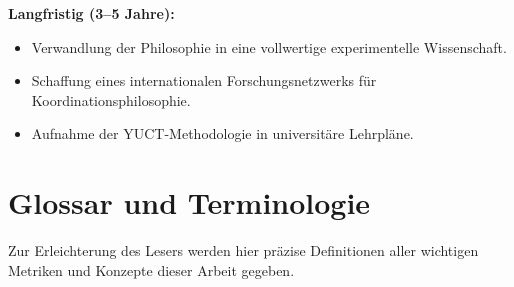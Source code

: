 \documentclass[12pt,a4paper]{article}
\begin{document}
	\textbf{Langfristig (3–5 Jahre):}
	\begin{itemize}
		\item Verwandlung der Philosophie in eine vollwertige experimentelle Wissenschaft.
		\item Schaffung eines internationalen Forschungsnetzwerks für Koordinationsphilosophie.
		\item Aufnahme der YUCT-Methodologie in universitäre Lehrpläne.
	\end{itemize}
	
	\section{Glossar und Terminologie}
	\label{sec:glossary}
	
	Zur Erleichterung des Lesers werden hier präzise Definitionen aller wichtigen Metriken und Konzepte dieser Arbeit gegeben.
	
\end{document}
